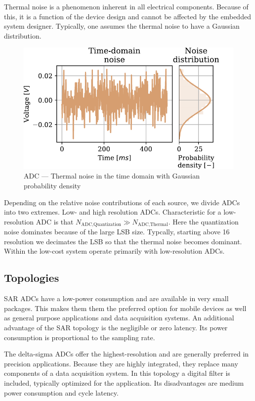 Thermal noise is a phenomenon inherent in all electrical components. Because of this, it is a function of the device design and cannot be affected by the embedded system designer. Typically, one assumes the thermal noise to have a Gaussian distribution.

\begin{figure}
  \centering
  \includegraphics[scale=0.72]{figures/electronics/adc/plot_thermerr}
  \caption[ADC thermal noise]{ADC --- Thermal noise in the time domain with Gaussian probability density~\cite{hall2020fund}%
    \label{fig:plot_themerr}}
\end{figure}

Depending on the relative noise contributions of each source, we divide \ac{ADC}s into two extremes. Low- and high resolution \ac{ADC}s. Characteristic for a low-resolution \ac{ADC} is that $N_{\text{ADC},\text{Quantization}}\gg N_{\text{ADC},\text{Thermal}}$. Here the quantization noise dominates because of the large \ac{LSB} size. Typcally, starting above \SI{16}{\bit} resolution we decimates the \ac{LSB} so that the thermal noise becomes dominant. Within the low-cost system operate primarily with low-resolution \ac{ADC}s.

\subsection{Topologies}
\ac{SAR} \ac{ADC}s have a low-power consumption and are available in very small packages. This makes them them the preferred option for mobile devices as well as general purpose applications and data acquisition systems. An additional advantage of the \ac{SAR} topology is the negligible or zero latency. Its power consumption is proportional to the sampling rate.

The delta-sigma \ac{ADC}s offer the highest-resolution and are generally preferred in precision applications. Because they are highly integrated, they replace many components of a data acquisition system. In this topology a digital filter is included, typically optimized for the application. Its disadvantages are medium power consumption and cycle latency.

